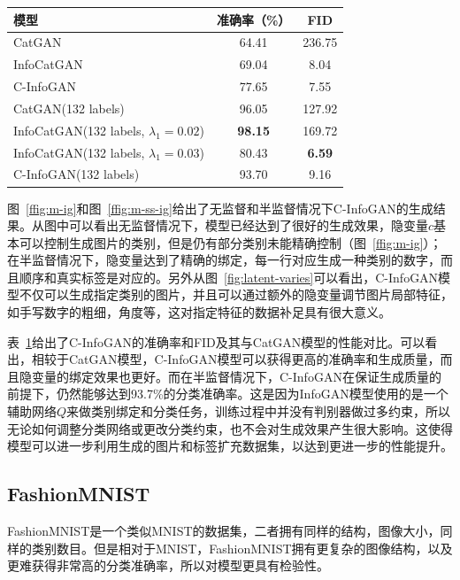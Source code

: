 \begin{table}[htbp]
  \centering
  \label{tab:cat}
  \begin{tabular}{lcc}
    \toprule
    \textbf{模型} & \textbf{准确率（\%）} & \textbf{FID} \\
    \midrule
    CatGAN & 64.41 & 236.75  \\ 
    InfoCatGAN & 69.04 & 8.04 \\ 
    C-InfoGAN & 77.65 & 7.55 \\ 
    CatGAN(132 labels) & 96.05 & 127.92 \\ 
    InfoCatGAN(132 labels, $\lambda_1 = 0.02$) & \textbf{98.15} & 169.72 \\
    InfoCatGAN(132 labels, $\lambda_1 = 0.03$) & 80.43 & \textbf{6.59} \\
    C-InfoGAN(132 labels) & 93.70 & 9.16 \\
    \bottomrule
  \end{tabular}
\end{table}

图~\ref{ffig:m-ig}和图~\ref{ffig:m-ss-ig}给出了无监督和半监督情况下C-InfoGAN的生成结果。从图中可以看出无监督情况下，模型已经达到了很好的生成效果，隐变量$c$基本可以控制生成图片的类别，但是仍有部分类别未能精确控制（图~\ref{ffig:m-ig}）；在半监督情况下，隐变量达到了精确的绑定，每一行对应生成一种类别的数字，而且顺序和真实标签是对应的。另外从图~\ref{fig:latent-varies}可以看出，C-InfoGAN模型不仅可以生成指定类别的图片，并且可以通过额外的隐变量调节图片局部特征，如手写数字的粗细，角度等，这对指定特征的数据补足具有很大意义。

表~\ref{tab:cat}给出了C-InfoGAN的准确率和FID及其与CatGAN模型的性能对比。可以看出，相较于CatGAN模型，C-InfoGAN模型可以获得更高的准确率和生成质量，而且隐变量的绑定效果也更好。而在半监督情况下，C-InfoGAN在保证生成质量的前提下，仍然能够达到93.7\%的分类准确率。这是因为InfoGAN模型使用的是一个辅助网络$Q$来做类别绑定和分类任务，训练过程中并没有判别器做过多约束，所以无论如何调整分类网络或更改分类约束，也不会对生成效果产生很大影响。这使得模型可以进一步利用生成的图片和标签扩充数据集，以达到更进一步的性能提升。

\subsection{FashionMNIST}\label{sec:fashion}

FashionMNIST\citep{xiao2017/online}是一个类似MNIST的数据集，二者拥有同样的结构，图像大小，同样的类别数目。但是相对于MNIST，FashionMNIST拥有更复杂的图像结构，以及更难获得非常高的分类准确率，所以对模型更具有检验性。


